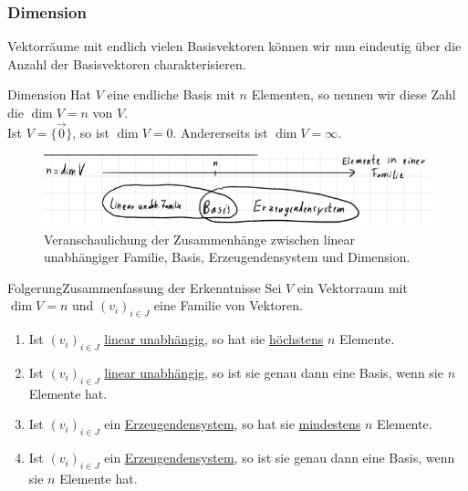 \subsubsection{Dimension}
Vektorräume mit endlich vielen Basisvektoren können wir nun eindeutig über die Anzahl der Basisvektoren charakterisieren.
\begin{Def}
{Dimension}
Hat $V$ eine endliche Basis mit $n$ Elementen, so nennen wir diese Zahl die  $\dim V=n$ von $V$.\\
Ist $V=\{\Vec{0}\}$, so ist $\dim V=0$. Andererseits ist $\dim V=\infty$.
\end{Def}
\begin{figure}[htbp]
\centering
\includegraphics[width=.7\textwidth]{Dateien/00/11Dimensionschaubild.PNG}
\caption*{Veranschaulichung der Zusammenhänge zwischen linear unabhängiger Familie, Basis, Erzeugendensystem und Dimension.}
\end{figure}
\begin{Satz}
{Folgerung}{Zusammenfassung der Erkenntnisse}
Sei $V$ ein Vektorraum mit $\dim V= n$ und $(v_i)_{i\in J}$ eine Familie von Vektoren.
\begin{enumerate}
    \item Ist $(v_i)_{i\in J}$ \underline{linear unabhängig}, so hat sie \underline{höchstens} $n$ Elemente.
    \item Ist $(v_i)_{i\in J}$ \underline{linear unabhängig}, so ist sie genau dann eine Basis, wenn sie $n$ Elemente hat.
    \item Ist $(v_i)_{i\in J}$ ein \underline{Erzeugendensystem}, so hat sie \underline{mindestens} $n$ Elemente.
    \item Ist $(v_i)_{i\in J}$ ein \underline{Erzeugendensystem}, so ist sie genau dann eine Basis, wenn sie $n$ Elemente hat.
\end{enumerate}
\end{Satz}
